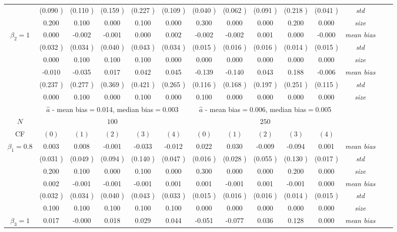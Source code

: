 \begin{table}
\begin{threeparttable}
{\begin{tabular}{|c|c|c|c|c|c|c|c|c|c|c|c|c|c|}
&(0.090 )&(0.110 )&(0.159 )&(0.227 )&(0.109 )&(0.040 )&(0.062 )&(0.091 )&(0.218 )&(0.041 )&\textit{std}\\ 
& 0.200 & 0.100 &0.000 &0.100 &0.000 &0.300& 0.000 &0.000 &0.200& 0.000 &\textit{size} \\ \midrule 
\multirow{4}{*}{$\beta_2=1$}& 0.000 & -0.002 &-0.001 &0.000 &0.002 &-0.002& -0.002 &0.001 &0.000& -0.000 &\textit{mean bias} \\ 
&(0.032 )&(0.034 )&(0.040 )&(0.043 )&(0.034 )&(0.015 )&(0.016 )&(0.016 )&(0.014 )&(0.015 )&\textit{std}\\ 
& 0.000 & 0.100 &0.100 &0.100 &0.000 &0.000& 0.000 &0.000& 0.000 &0.000 &\textit{size} \\\midrule 
\multirow{4}{*}{$\beta_3=1$}& -0.010 & -0.035 &0.017& 0.042 &0.045 &-0.139 &-0.140 &0.043 &0.188& -0.006 &\textit{mean bias} \\ 
&(0.237 )&(0.277 )&(0.369 )&(0.421 )&(0.265 )&(0.116 )&(0.168 )&(0.197 )&(0.251 )&(0.115 )&\textit{std}\\ 
& 0.000 & 0.100 &0.000 &0.100 &0.000 &0.100& 0.000& 0.000 &0.000 &0.000 &\textit{size} \\\midrule 
&\multicolumn{5}{|c|}{$\hat{a}$ - mean bias$=$0.014, median bias$=$0.003 }&\multicolumn{5}{|c|}{$\hat{a}$ - mean bias$=$0.006, median bias$=$0.005 }&\\ \hline 
\cellcolor{yellow}$N$&\multicolumn{5}{|c|}{\cellcolor{yellow}$100$}&\multicolumn{5}{|c|}{\cellcolor{yellow}$250$}&\\\hline 
CF&$(0)$&$(1)$&$(2)$&$(3)$&$(4)$& $(0)$ &$(1)$&$(2)$&$(3)$&$(4)$&\\\hline 
\multirow{4}{*}{$\beta_1=0.8$}& 0.003 & 0.008 &-0.001 &-0.033 &-0.012 &0.022& 0.030 &-0.009 &-0.094& 0.001 &\textit{mean bias} \\ 
&(0.031 )&(0.049 )&(0.094 )&(0.140 )&(0.047 )&(0.016 )&(0.028 )&(0.055 )&(0.130 )&(0.017 )&\textit{std}\\ 
& 0.200 & 0.100 &0.000 &0.100 &0.000 &0.300& 0.000 &0.000 &0.200& 0.000 &\textit{size} \\\midrule 
\multirow{4}{*}{$\beta_2=1$}& 0.002 & -0.001 &-0.001 &-0.001 &0.001 &0.001& -0.001 &0.001 &-0.001& 0.000 &\textit{mean bias} \\ 
&(0.032 )&(0.034 )&(0.040 )&(0.043 )&(0.033 )&(0.015 )&(0.016 )&(0.016 )&(0.014 )&(0.015 )&\textit{std}\\ 
& 0.100 & 0.100 &0.100 &0.100 &0.100 &0.000& 0.000 &0.000& 0.000 &0.000 &\textit{size} \\ \midrule
\multirow{4}{*}{$\beta_3=1$}& 0.017 & -0.000 &0.018& 0.029 &0.044 &-0.051 &-0.077 &0.036 &0.128& 0.000 &\textit{mean bias} \\ 

\end{tabular}}
\end{threeparttable}
\end{table}
